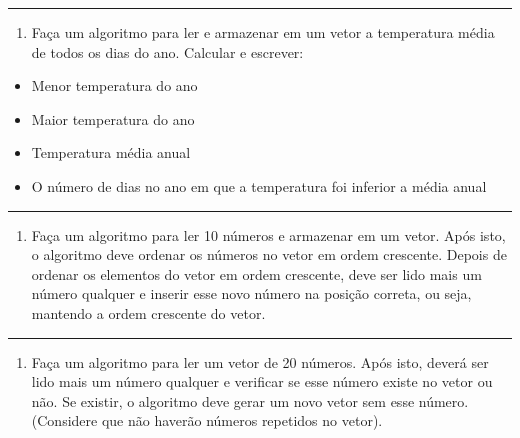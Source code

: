 \documentclass[12pt,a4paper]{article}
\renewcommand{\linethickness}{0.05em}
\providecommand{\tightlist}{%
      \setlength{\itemsep}{0pt}\setlength{\parskip}{0pt}}
\begin{document}
    \begin{center}\rule{0.5\linewidth}{\linethickness}\end{center}

\begin{enumerate}
\def\labelenumi{\arabic{enumi}.}
\setcounter{enumi}{8}
\tightlist
\item
  Faça um algoritmo para ler e armazenar em um vetor a temperatura média
  de todos os dias do ano. Calcular e escrever:
\end{enumerate}

\begin{itemize}
\tightlist
\item
  Menor temperatura do ano
\item
  Maior temperatura do ano
\item
  Temperatura média anual
\item
  O número de dias no ano em que a temperatura foi inferior a média
  anual
\end{itemize}

    \begin{center}\rule{0.5\linewidth}{\linethickness}\end{center}

\begin{enumerate}
\def\labelenumi{\arabic{enumi}.}
\setcounter{enumi}{9}
\tightlist
\item
  Faça um algoritmo para ler 10 números e armazenar em um vetor. Após
  isto, o algoritmo deve ordenar os números no vetor em ordem crescente.
  Depois de ordenar os elementos do vetor em ordem crescente, deve ser
  lido mais um número qualquer e inserir esse novo número na posição
  correta, ou seja, mantendo a ordem crescente do vetor.
\end{enumerate}

    \begin{center}\rule{0.5\linewidth}{\linethickness}\end{center}

\begin{enumerate}
\def\labelenumi{\arabic{enumi}.}
\setcounter{enumi}{10}
\tightlist
\item
  Faça um algoritmo para ler um vetor de 20 números. Após isto, deverá
  ser lido mais um número qualquer e verificar se esse número existe no
  vetor ou não. Se existir, o algoritmo deve gerar um novo vetor sem
  esse número. (Considere que não haverão números repetidos no vetor).
\end{enumerate}
\end{document}
